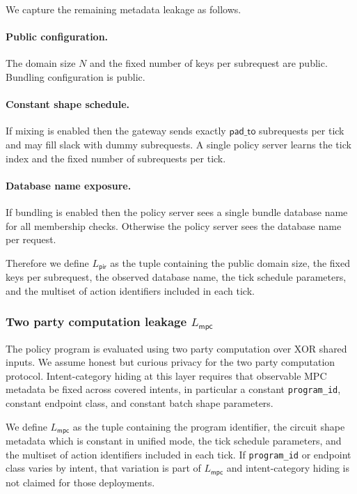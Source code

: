 We capture the remaining metadata leakage as follows.

\paragraph{Public configuration.}
The domain size $N$ and the fixed number of keys per subrequest are public.
Bundling configuration is public.

\paragraph{Constant shape schedule.}
If mixing is enabled then the gateway sends exactly $\mathsf{pad\_to}$ subrequests per tick and may fill slack with dummy subrequests.
A single policy server learns the tick index and the fixed number of subrequests per tick.

\paragraph{Database name exposure.}
If bundling is enabled then the policy server sees a single bundle database name for all membership checks.
Otherwise the policy server sees the database name per request.

Therefore we define $L_{\mathsf{pir}}$ as the tuple containing
the public domain size,
the fixed keys per subrequest,
the observed database name,
the tick schedule parameters,
and the multiset of action identifiers included in each tick.

\subsubsection{Two party computation leakage $L_{\mathsf{mpc}}$}

The policy program is evaluated using two party computation over XOR shared inputs.
We assume honest but curious privacy for the two party computation protocol.
Intent-category hiding at this layer requires that observable MPC metadata be fixed across covered
intents, in particular a constant \texttt{program\_id}, constant endpoint class, and constant batch
shape parameters.

We define $L_{\mathsf{mpc}}$ as the tuple containing
the program identifier,
the circuit shape metadata which is constant in unified mode,
the tick schedule parameters,
and the multiset of action identifiers included in each tick.
If \texttt{program\_id} or endpoint class varies by intent, that variation is part of
$L_{\mathsf{mpc}}$ and intent-category hiding is not claimed for those deployments.

